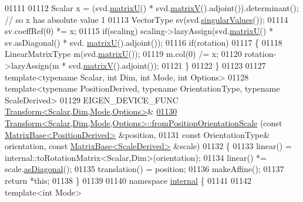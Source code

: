 \begin{DoxyCode}
01111 
01112   Scalar x = (svd.\hyperlink{group___s_v_d___module_afc7fe1546b0f6e1801b86f22f5664cb8}{matrixU}() * svd.\hyperlink{group___s_v_d___module_a245a453b5e7347f737295c23133238c4}{matrixV}().adjoint()).determinant(); \textcolor{comment}{// so x has absolute
       value 1}
01113   VectorType sv(svd.\hyperlink{group___s_v_d___module_a4e7bac123570c348f7ed6be909e1e474}{singularValues}());
01114   sv.coeffRef(0) *= x;
01115   \textcolor{keywordflow}{if}(scaling) scaling->lazyAssign(svd.\hyperlink{group___s_v_d___module_afc7fe1546b0f6e1801b86f22f5664cb8}{matrixU}() * sv.asDiagonal() * svd.
      \hyperlink{group___s_v_d___module_afc7fe1546b0f6e1801b86f22f5664cb8}{matrixU}().adjoint());
01116   \textcolor{keywordflow}{if}(rotation)
01117   \{
01118     LinearMatrixType m(svd.\hyperlink{group___s_v_d___module_afc7fe1546b0f6e1801b86f22f5664cb8}{matrixU}());
01119     m.col(0) /= x;
01120     rotation->lazyAssign(m * svd.\hyperlink{group___s_v_d___module_a245a453b5e7347f737295c23133238c4}{matrixV}().adjoint());
01121   \}
01122 \}
01123 
01127 \textcolor{keyword}{template}<\textcolor{keyword}{typename} Scalar, \textcolor{keywordtype}{int} Dim, \textcolor{keywordtype}{int} Mode, \textcolor{keywordtype}{int} Options>
01128 \textcolor{keyword}{template}<\textcolor{keyword}{typename} PositionDerived, \textcolor{keyword}{typename} OrientationType, \textcolor{keyword}{typename} ScaleDerived>
01129 EIGEN\_DEVICE\_FUNC \hyperlink{group___geometry___module_class_eigen_1_1_transform}{Transform<Scalar,Dim,Mode,Options>}&
\hyperlink{group___geometry___module_ad59b171c05cebefdefdf2efe2fe87f2b}{01130} \hyperlink{group___geometry___module_class_eigen_1_1_transform}{Transform<Scalar,Dim,Mode,Options>::fromPositionOrientationScale}
      (\textcolor{keyword}{const} \hyperlink{group___core___module_class_eigen_1_1_matrix_base}{MatrixBase<PositionDerived>} &position,
01131   \textcolor{keyword}{const} OrientationType& orientation, \textcolor{keyword}{const} \hyperlink{group___core___module_class_eigen_1_1_matrix_base}{MatrixBase<ScaleDerived>} &scale)
01132 \{
01133   linear() = internal::toRotationMatrix<Scalar,Dim>(orientation);
01134   linear() *= scale.\hyperlink{group___core___module_a14235b62c90f93fe910070b4743782d0}{asDiagonal}();
01135   translation() = position;
01136   makeAffine();
01137   \textcolor{keywordflow}{return} *\textcolor{keyword}{this};
01138 \}
01139 
01140 \textcolor{keyword}{namespace }\hyperlink{namespaceinternal}{internal} \{
01141 
01142 \textcolor{keyword}{template}<\textcolor{keywordtype}{int} Mode>

\end{DoxyCode}
